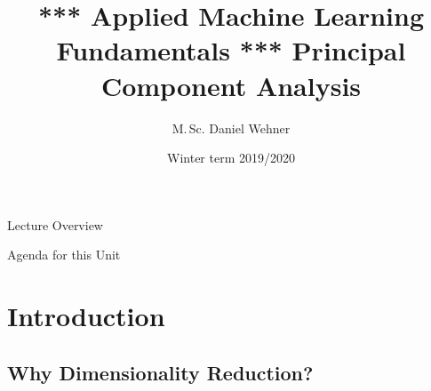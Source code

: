 


\title[Principal Component Analysis]{*** Applied Machine Learning Fundamentals *** Principal Component Analysis}
\author{M.\,Sc. Daniel Wehner}
\date{Winter term 2019/2020}




\maketitlepage


\begin{frame}{Lecture Overview}{}
\end{frame}


\begin{frame}{Agenda for this Unit}
	\begin{multicols}{2}
		\tableofcontents
	\end{multicols}
\end{frame}


\section{Introduction}

\subsection{Why Dimensionality Reduction?}

